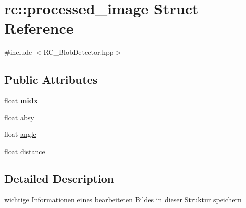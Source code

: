 \hypertarget{structrc_1_1processed__image}{\section{rc\+:\+:processed\+\_\+image Struct Reference}
\label{structrc_1_1processed__image}
}


{\ttfamily \#include $<$R\+C\+\_\+\+Blob\+Detector.\+hpp$>$}

\subsection*{Public Attributes}
\begin{DoxyCompactItemize}
\item 
\hypertarget{structrc_1_1processed__image_a0213f6e61795e2dbcaa500885554dbde}{float {\bfseries midx}}\label{structrc_1_1processed__image_a0213f6e61795e2dbcaa500885554dbde}

\item 
float \hyperlink{structrc_1_1processed__image_a3885be6e15744069afb4b429777497fa}{absy}
\item 
float \hyperlink{structrc_1_1processed__image_ac17fea85630583e2cf1de55b89334e4f}{angle}
\item 
float \hyperlink{structrc_1_1processed__image_a6f90b2318450001568fcc112e294f8df}{distance}
\end{DoxyCompactItemize}


\subsection{Detailed Description}
wichtige Informationen eines bearbeiteten Bildes in dieser Struktur speichern 

